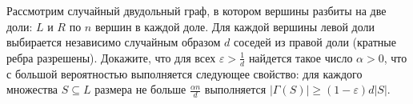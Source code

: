 Рассмотрим случайный двудольный граф, в котором вершины разбиты на две доли: $L$ и $R$ по $n$ вершин в
каждой доле. Для каждой вершины левой доли выбирается независимо случайным образом $d$ соседей из правой
доли (кратные ребра разрешены). Докажите, что для всех $\varepsilon > \frac{1}{d}$ найдется такое число
$\alpha > 0$, что с большой вероятностью выполняется следующее свойство: для каждого множества $S
\subseteq L$ размера не больше $\frac{\alpha n}{d}$ выполняется $|\Gamma(S)| \ge (1 - \varepsilon)d |S|$.
